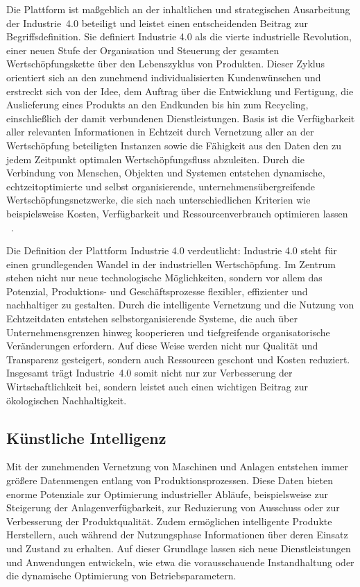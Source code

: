 Die Plattform ist maßgeblich an der inhaltlichen und strategischen Ausarbeitung der \mbox{Industrie 4.0} beteiligt und leistet einen entscheidenden Beitrag zur Begriffsdefinition. 
Sie definiert Industrie 4.0 als
\glqq die vierte industrielle Revolution, einer neuen Stufe der Organisation und Steuerung der gesamten Wertschöpfungskette über den Lebenszyklus von Produkten.
Dieser Zyklus orientiert sich an den zunehmend individualisierten Kundenwünschen und erstreckt sich von der Idee, dem Auftrag über die Entwicklung und Fertigung, die Auslieferung eines Produkts an den Endkunden bis hin zum Recycling, einschließlich der damit verbundenen Dienstleistungen.
Basis ist die Verfügbarkeit aller relevanten Informationen in Echtzeit durch Vernetzung aller an der Wertschöpfung beteiligten Instanzen sowie die Fähigkeit aus den Daten den zu jedem Zeitpunkt optimalen Wertschöpfungsfluss abzuleiten. 
Durch die Verbindung von Menschen, Objekten und Systemen entstehen dynamische, echtzeitoptimierte und selbst organisierende, unternehmensübergreifende Wertschöpfungsnetzwerke, die sich nach unterschiedlichen Kriterien wie beispielsweise Kosten, Verfügbarkeit und Ressourcenverbrauch optimieren lassen \grqq~\cite[S. 8]{plattform_i40_definition}.

\newpage
Die Definition der Plattform Industrie 4.0 verdeutlicht: Industrie 4.0 steht für einen grundlegenden Wandel in der industriellen Wertschöpfung.
Im Zentrum stehen nicht nur neue technologische Möglichkeiten, sondern vor allem das Potenzial, Produktions- und Geschäftsprozesse flexibler, effizienter und nachhaltiger zu gestalten.
Durch die intelligente Vernetzung und die Nutzung von Echtzeitdaten entstehen selbstorganisierende Systeme, die auch über Unternehmensgrenzen hinweg kooperieren und tiefgreifende organisatorische Veränderungen erfordern.
Auf diese Weise werden nicht nur Qualität und Transparenz gesteigert, sondern auch Ressourcen geschont und Kosten reduziert.
Insgesamt trägt \mbox{Industrie 4.0} somit nicht nur zur Verbesserung der Wirtschaftlichkeit bei, sondern leistet auch einen wichtigen Beitrag zur ökologischen Nachhaltigkeit.

\subsection{Künstliche Intelligenz}
Mit der zunehmenden Vernetzung von Maschinen und Anlagen entstehen immer größere Datenmengen entlang von Produktionsprozessen.
Diese Daten bieten enorme Potenziale zur Optimierung industrieller Abläufe, beispielsweise zur Steigerung der Anlagenverfügbarkeit, zur Reduzierung von Ausschuss oder zur Verbesserung der Produktqualität.
Zudem ermöglichen intelligente Produkte Herstellern, auch während der Nutzungsphase Informationen über deren Einsatz und Zustand zu erhalten.
Auf dieser Grundlage lassen sich neue Dienstleistungen und Anwendungen entwickeln, wie etwa die vorausschauende Instandhaltung oder die dynamische Optimierung von Betriebsparametern.

